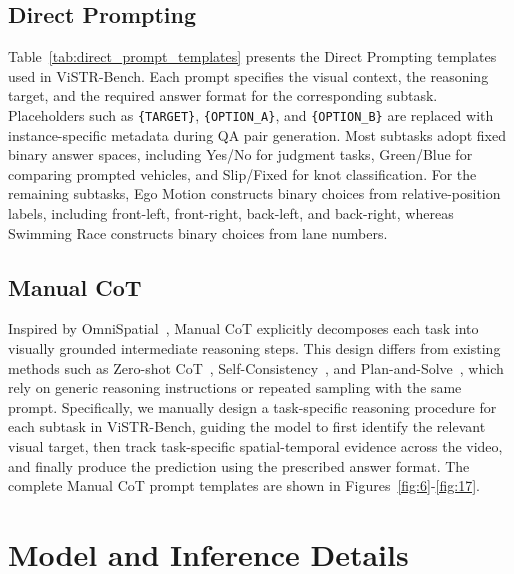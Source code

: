 \subsection{Direct Prompting}

Table~\ref{tab:direct_prompt_templates} presents the Direct Prompting templates used in ViSTR-Bench.
Each prompt specifies the visual context, the reasoning target, and the required answer format for the corresponding subtask.
Placeholders such as \texttt{\{TARGET\}}, \texttt{\{OPTION\_A\}}, and \texttt{\{OPTION\_B\}} are replaced with instance-specific metadata during QA pair generation.
Most subtasks adopt fixed binary answer spaces, including Yes/No for judgment tasks, Green/Blue for comparing prompted vehicles, and Slip/Fixed for knot classification.
For the remaining subtasks, Ego Motion constructs binary choices from relative-position labels, including front-left, front-right, back-left, and back-right, whereas Swimming Race constructs binary choices from lane numbers.

\subsection{Manual CoT}

Inspired by OmniSpatial~\citep{OmniSpatial}, Manual CoT explicitly decomposes each task into visually grounded intermediate reasoning steps.
This design differs from existing methods such as Zero-shot CoT~\citep{zero-shot-cot}, Self-Consistency~\citep{self-consistency-coT}, and Plan-and-Solve~\citep{plan-and-solve}, which rely on generic reasoning instructions or repeated sampling with the same prompt.
Specifically, we manually design a task-specific reasoning procedure for each subtask in ViSTR-Bench, guiding the model to first identify the relevant visual target, then track task-specific spatial-temporal evidence across the video, and finally produce the prediction using the prescribed answer format.
The complete Manual CoT prompt templates are shown in Figures~\ref{fig:6}-\ref{fig:17}.

\section{Model and Inference Details}
\label{sec:model_inference_details}

